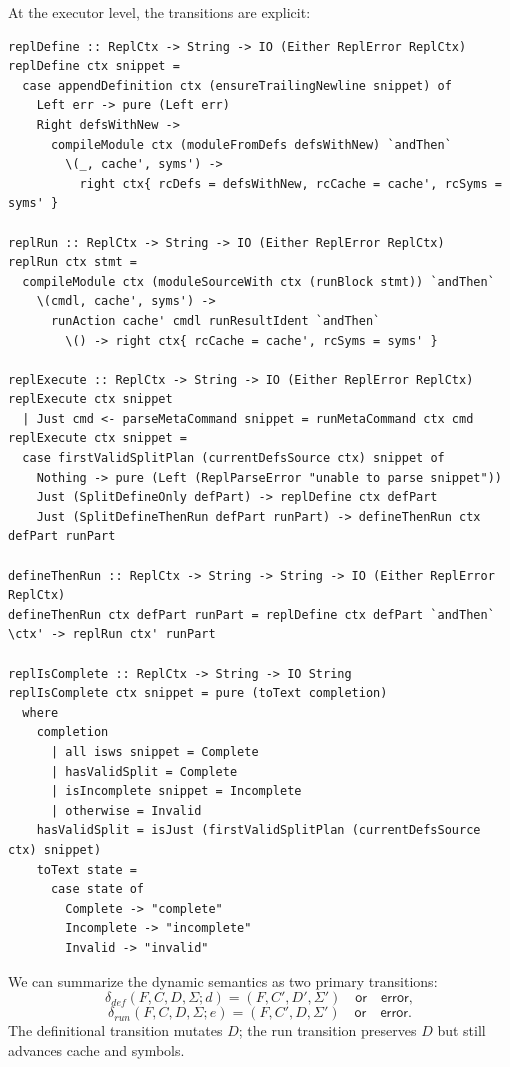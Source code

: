 At the executor level, the transitions are explicit:

\begin{verbatim}
replDefine :: ReplCtx -> String -> IO (Either ReplError ReplCtx)
replDefine ctx snippet =
  case appendDefinition ctx (ensureTrailingNewline snippet) of
    Left err -> pure (Left err)
    Right defsWithNew ->
      compileModule ctx (moduleFromDefs defsWithNew) `andThen`
        \(_, cache', syms') ->
          right ctx{ rcDefs = defsWithNew, rcCache = cache', rcSyms = syms' }

replRun :: ReplCtx -> String -> IO (Either ReplError ReplCtx)
replRun ctx stmt =
  compileModule ctx (moduleSourceWith ctx (runBlock stmt)) `andThen`
    \(cmdl, cache', syms') ->
      runAction cache' cmdl runResultIdent `andThen`
        \() -> right ctx{ rcCache = cache', rcSyms = syms' }

replExecute :: ReplCtx -> String -> IO (Either ReplError ReplCtx)
replExecute ctx snippet
  | Just cmd <- parseMetaCommand snippet = runMetaCommand ctx cmd
replExecute ctx snippet =
  case firstValidSplitPlan (currentDefsSource ctx) snippet of
    Nothing -> pure (Left (ReplParseError "unable to parse snippet"))
    Just (SplitDefineOnly defPart) -> replDefine ctx defPart
    Just (SplitDefineThenRun defPart runPart) -> defineThenRun ctx defPart runPart

defineThenRun :: ReplCtx -> String -> String -> IO (Either ReplError ReplCtx)
defineThenRun ctx defPart runPart = replDefine ctx defPart `andThen` \ctx' -> replRun ctx' runPart

replIsComplete :: ReplCtx -> String -> IO String
replIsComplete ctx snippet = pure (toText completion)
  where
    completion
      | all isws snippet = Complete
      | hasValidSplit = Complete
      | isIncomplete snippet = Incomplete
      | otherwise = Invalid
    hasValidSplit = isJust (firstValidSplitPlan (currentDefsSource ctx) snippet)
    toText state =
      case state of
        Complete -> "complete"
        Incomplete -> "incomplete"
        Invalid -> "invalid"
\end{verbatim}

We can summarize the dynamic semantics as two primary transitions:
$$
\delta_{def}(F,C,D,\Sigma; d) = (F, C', D', \Sigma') \quad \mathsf{or} \quad \mathsf{error},
$$
$$
\delta_{run}(F,C,D,\Sigma; e) = (F, C', D, \Sigma') \quad \mathsf{or} \quad \mathsf{error}.
$$
The definitional transition mutates $D$; the run transition preserves $D$ but still advances cache and symbols.

